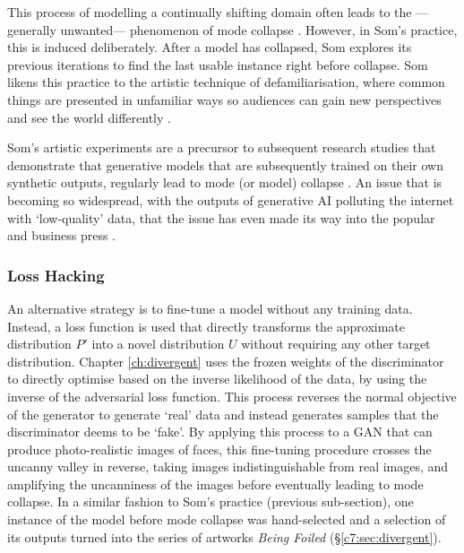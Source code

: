 This process of modelling a continually shifting domain often leads to the ---generally unwanted--- phenomenon of mode collapse \citep{thanh2020catastrophic}. 
However, in Som's practice, this is induced deliberately. After a model has collapsed, Som explores its previous iterations to find the last usable instance right before collapse. 
Som likens this practice to the artistic technique of defamiliarisation, where common things are presented in unfamiliar ways so audiences can gain new perspectives and see the world differently \citep{som2021personal}.

Som's artistic experiments are a precursor to subsequent research studies that demonstrate that generative models that are subsequently trained on their own synthetic outputs, regularly lead to mode (or model) collapse \citep{alemohammad2023self, martinez2023combining, shumailov2023curse, shumailov2024ai}. An issue that is becoming so widespread, with the outputs of generative AI polluting the internet with `low-quality' data, that the issue has even made its way into the popular and business press \citep{peel2024problem,aatish2024threat}.

\subsubsection{Loss Hacking} 

An alternative strategy is to fine-tune a model without any training data. 
Instead, a loss function is used that directly transforms the approximate distribution $P'$ into a novel distribution $U$ without requiring any other target distribution. 
Chapter \ref{ch:divergent} uses the frozen weights of the discriminator to directly optimise based on the inverse likelihood of the data, by using the inverse of the adversarial loss function. 
This process reverses the normal objective of the generator to generate `real' data and instead generates samples that the discriminator deems to be `fake'. 
By applying this process to a GAN that can produce photo-realistic images of faces, this fine-tuning procedure crosses the uncanny valley in reverse, taking images indistinguishable from real images, and amplifying the uncanniness of the images before eventually leading to mode collapse. 
In a similar fashion to Som's practice (previous sub-section), one instance of the model before mode collapse was hand-selected and a selection of its outputs turned into the series of artworks \textit{Being Foiled} \citep{broad2020being} (\S \ref{c7:sec:divergent}).

